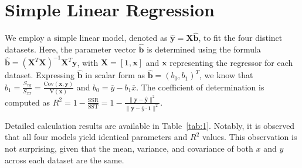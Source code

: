 \documentclass[12pt]{article}
\begin{document}
	\section{Simple Linear Regression}

%


We employ a simple linear model, denoted as $\hat{\mathbf{y}} = \mathbf{X}\hat{\mathbf{b}}$, to fit the four distinct datasets. Here, the parameter vector $\hat{\mathbf{b}}$ is determined using the formula $\hat{\mathbf{b}} = (\mathbf{X}^T\mathbf{X})^{-1}\mathbf{X}^T\mathbf{y}$, with $\mathbf{X} = [\mathbf{1}, \mathbf{x}]$ and $\mathbf{x}$ representing the regressor for each dataset. Expressing $\hat{\mathbf{b}}$ in scalar form as $\hat{\mathbf{b}} = \left( b_0,b_1 \right)^T$, we know that $b_1 = \frac{S_{xy}}{S_{xx}} = \frac{\text{Cov}(\mathbf{x},\mathbf{y})}{\text{V}(\mathbf{x})}$ and $b_0 = \overline{y} - b_1 \overline{x}$. The coefficient of determination is computed as $R^2 = 1-\frac{\text{SSR}}{\text{SST}} = 1 - \frac{\rVert \mathbf{y} - \hat{\mathbf{y}}\rVert^2}{\rVert \mathbf{y} - \overline{y}\cdot\mathbf{1}\rVert^2}$. 

Detailed calculation results are available in Table~\ref{tab:1}. Notably, it is observed that all four models yield identical parameters and $R^2$ values. This observation is not surprising, given that the mean, variance, and covariance of both $x$ and $y$ across each dataset are the same.
\end{document}
